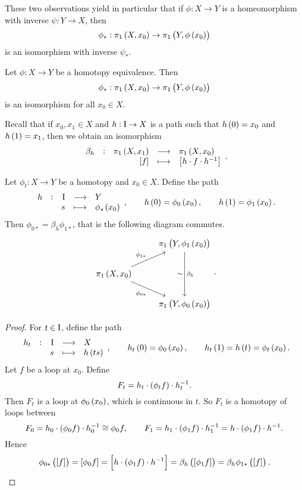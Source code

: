 These two observations yield in particular that if $ \phi : X \to Y $ is a homeomorphism with inverse $ \psi : Y \to X $, then
$$ \phi_* : \pi_1\br{X, x_0} \to \pi_1\br{Y, \phi\br{x_0}} $$
is an isomorphism with inverse $ \psi_* $.

\pagebreak


\begin{proposition}
\label{prop:1.18}
Let $ \phi : X \to Y $ be a homotopy equivalence. Then
$$ \phi_* : \pi_1\br{X, x_0} \to \pi_1\br{Y, \phi\br{x_0}} $$
is an isomorphism for all $ x_0 \in X $.
\end{proposition}

Recall that if $ x_0, x_1 \in X $ and $ h : \mathrm{I} \to X $ is a path such that $ h\br{0} = x_0 $ and $ h\br{1} = x_1 $, then we obtain an isomorphism
$$ \function[\beta_h]{\pi_1\br{X, x_1}}{\pi_1\br{X, x_0}}{\sbr{f}}{\sbr{h \cdot f \cdot h^{-1}}}. $$

\begin{lemma}
\label{lem:1.19}
Let $ \phi_t : X \to Y $ be a homotopy and $ x_0 \in X $. Define the path
$$ \function[h]{\I}{Y}{s}{\phi_s\br{x_0}}, \qquad h\br{0} = \phi_0\br{x_0}, \qquad h\br{1} = \phi_1\br{x_0}. $$
Then $ \phi_{0*} = \beta_h\phi_{1*} $, that is the following diagram commutes.
$$
\begin{tikzcd}
& \pi_1\br{Y, \phi_1\br{x_0}} \arrow{dd}{\beta_h}[swap]{\sim} \\
\pi_1\br{X, x_0} \arrow{ur}{\phi_{1*}} \arrow{dr}[swap]{\phi_{0*}} & \\
& \pi_1\br{Y, \phi_0\br{x_0}}
\end{tikzcd}.
$$
\end{lemma}

\begin{proof}
For $ t \in \mathrm{I} $, define the path
$$ \function[h_t]{\I}{X}{s}{h\br{ts}}, \qquad h_t\br{0} = \phi_0\br{x_0}, \qquad h_t\br{1} = h\br{t} = \phi_t\br{x_0}. $$
Let $ f $ be a loop at $ x_0 $. Define
$$ F_t = h_t \cdot \br{\phi_tf} \cdot h_t^{-1}. $$
Then $ F_t $ is a loop at $ \phi_0\br{x_0} $, which is continuous in $ t $. So $ F_t $ is a homotopy of loops between
$$ F_0 = h_0 \cdot \br{\phi_0f} \cdot h_0^{-1} \cong \phi_0f, \qquad F_1 = h_1 \cdot \br{\phi_1f} \cdot h_1^{-1} = h \cdot \br{\phi_1f} \cdot h^{-1}. $$
Hence
$$ \phi_{0*}\br{\sbr{f}} = \sbr{\phi_0f} = \sbr{h \cdot \br{\phi_1f} \cdot h^{-1}} = \beta_h\br{\sbr{\phi_1f}} = \beta_h\phi_{1*}\br{\sbr{f}}. $$
\end{proof}

